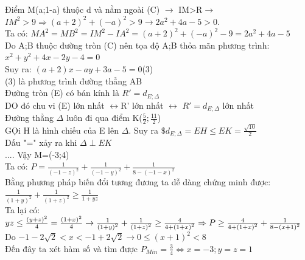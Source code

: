 Điểm M(a;1-a) thuộc d và  nằm ngoài (C) $\rightarrow$ IM>R$\rightarrow$$IM^{2}>9\Rightarrow(a+2)^{2}+(-a)^{2}>9\rightarrow2a^{2}+4a-5>0$.\\
Ta có: $MA^{2}=MB^{2}=IM^{2}-IA^{2}=\left ( a+2 \right )^{2}+\left ( -a \right 
)^{2}-9=2a^{2}+4a-5$\\
Do A;B thuộc đường tròn (C) nên tọa độ A;B thỏa mãn phương trình: $x^{2}+y^{2}+4x-2y-4=0$\\
Suy ra: $(a+2)x-ay+3a-5=0$\hspace{5mm}(3)\\
(3) là phương trình đường thẳng AB\\
Đường tròn (E) có bán kính là $R'=d_{E;\Delta }$\\
DO đó chu vi (E) lớn nhất $\leftrightarrow$R' lớn nhất $\leftrightarrow$ $R'=d_{E;\Delta }$ lớn nhất\\
Đường thẳng $\Delta$ luôn đi qua điểm K($\frac{5}{2};\frac{11}{2}$)\\
GỌi H là hình chiếu của E lên $\Delta$. Suy ra $\$d_{E;\Delta }=EH\leq EK=\frac{\sqrt{10}}{2}$\\
Dấu "=" xảy ra khi $\Delta \perp EK$\\
....
Vậy M=(-3;4)\\
\hda 
Ta có: $P=\frac{1}{\left ( -1-z \right )^{2}}+\frac{1}{\left ( -1-y \right )^{2}}+\frac{1}{8-\left ( -1-x \right )^{2}}$\\
Bằng phương pháp biến đổi tương đương ta dễ dàng chứng minh được:\\
$\frac{1}{\left ( 1+y \right )^{2}}+\frac{1}{\left ( 1+z \right )^{2}}\geq \frac{1}{1+yz}$\\
Ta lại có: $yz\leq \frac{\left ( y+z \right )^{2}}{4}=\frac{\left ( 1+x \right )^{2}}{4}\rightarrow \frac{1}{\left ( 1+y \right )^{2}}+\frac{1}{\left ( 1+z \right )^{2}}\geq \frac{4}{4+\left ( 1+x \right )^{2}}\\
\Rightarrow P\geq \frac{4}{4+\left ( 1+x \right )^{2}}+\frac{1}{8-\left ( x+1 \right )^{2}}$
Do $-1-2\sqrt{2}< x< -1+2\sqrt{2}\rightarrow 0\leq \left ( x+1 \right )^{2}< 8$\\
Đến đây ta xét hàm số và tìm được $P_{Min}=\frac{3}{4}\Leftrightarrow x=-3;y=z=1$\\

